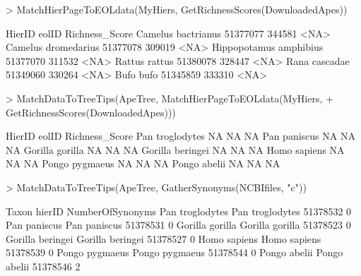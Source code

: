 \documentclass[12pt]{article}
\begin{document}
\begin{Schunk}
\begin{Sinput}
> MatchHierPageToEOLdata(MyHiers, GetRichnessScores(DownloadedApes))
\end{Sinput}
\begin{Soutput}
                         HierID  eolID Richness_Score
Camelus bactrianus     51377077 344581           <NA>
Camelus dromedarius    51377078 309019           <NA>
Hippopotamus amphibius 51377070 311532           <NA>
Rattus rattus          51380078 328447           <NA>
Rana cascadae          51349060 330264           <NA>
Bufo bufo              51345859 333310           <NA>
\end{Soutput}
\begin{Sinput}
> MatchDataToTreeTips(ApeTree, MatchHierPageToEOLdata(MyHiers, 
+      GetRichnessScores(DownloadedApes)))
\end{Sinput}
\begin{Soutput}
                 HierID eolID Richness_Score
Pan troglodytes      NA    NA             NA
Pan paniscus         NA    NA             NA
Gorilla gorilla      NA    NA             NA
Gorilla beringei     NA    NA             NA
Homo sapiens         NA    NA             NA
Pongo pygmaeus       NA    NA             NA
Pongo abelii         NA    NA             NA
\end{Soutput}
\begin{Sinput}
> MatchDataToTreeTips(ApeTree, GatherSynonyms(NCBIfiles, "c"))
\end{Sinput}
\begin{Soutput}
                            Taxon   hierID NumberOfSynonyms
Pan troglodytes   Pan troglodytes 51378532                0
Pan paniscus         Pan paniscus 51378531                0
Gorilla gorilla   Gorilla gorilla 51378523                0
Gorilla beringei Gorilla beringei 51378527                0
Homo sapiens         Homo sapiens 51378539                0
Pongo pygmaeus     Pongo pygmaeus 51378544                0
Pongo abelii         Pongo abelii 51378546                2
\end{Soutput}
\end{Schunk}
\end{document}
